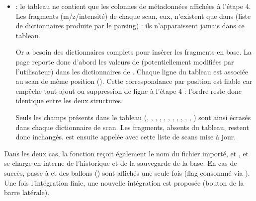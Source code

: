 \documentclass[letterpaper,10pt,english]{sphinxmanual}
\begin{document}
\begin{enumerate}
\begin{itemize}
\item {} 
\sphinxAtStartPar
{} : le tableau  ne contient que les colonnes de
métadonnées affichées à l’étape 4. Les fragments (m/z/intensité) de
chaque scan, eux, n’existent que dans  (liste
de dictionnaires produite par le parsing) : ils n’apparaissent jamais
dans ce tableau.

\sphinxAtStartPar
Or  a besoin des dictionnaires complets
pour insérer les fragments en base. La page reporte donc d’abord les
valeurs de  (potentiellement modifiées par
l’utilisateur) dans les dictionnaires de .
Chaque ligne du tableau est associée au scan de même position
(). Cette correspondance par position est fiable car
 empêche tout ajout ou suppression de ligne à
l’étape 4 : l’ordre reste donc identique entre les deux structures.

\sphinxAtStartPar
Seuls les champs présents dans le tableau (,
, , ,
, , , ,
, , , ) sont
ainsi écrasés dans chaque dictionnaire de scan. Les fragments, absents
du tableau, restent donc inchangés. 
est ensuite appelée avec cette liste de scans mise à jour.

\end{itemize}

\sphinxAtStartPar
Dans les deux cas, la fonction reçoit également le nom du fichier importé,
 et , et se charge en interne de
l’historique et de la sauvegarde de la base. En cas de succès,
 passe à  et des ballons ()
sont affichés une seule fois (flag  consommé via
). Une fois l’intégration finie, une nouvelle intégration est proposée
(bouton  de la barre latérale).

\end{enumerate}
\end{document}
